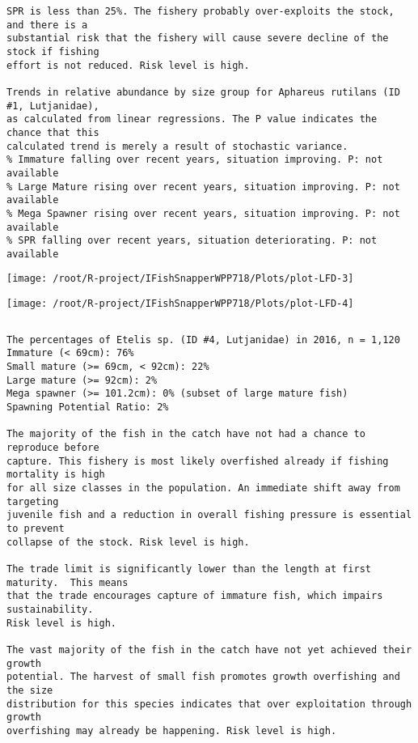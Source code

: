 \documentclass{report}\usepackage[]{graphicx}\usepackage[]{color}
\makeatletter
\def\maxwidth{ %
  \ifdim\Gin@nat@width>\linewidth
    \linewidth
  \else
    \Gin@nat@width
  \fi
}
\newenvironment{kframe}{%
 \def\at@end@of@kframe{}%
 \ifinner\ifhmode%
  \def\at@end@of@kframe{\end{minipage}}%
  \begin{minipage}{\columnwidth}%
 \fi\fi%
 \def\FrameCommand##1{\hskip\@totalleftmargin \hskip-\fboxsep
 \colorbox{shadecolor}{##1}\hskip-\fboxsep
     \hskip-\linewidth \hskip-\@totalleftmargin \hskip\columnwidth}%
 \MakeFramed {\advance\hsize-\width
   \@totalleftmargin\z@ \linewidth\hsize
   \@setminipage}}%
 {\par\unskip\endMakeFramed%
 \at@end@of@kframe}
\newenvironment{knitrout}{}{} %
\makeatother
\begin{document}
\begin{knitrout}
\begin{kframe}
\begin{verbatim}
SPR is less than 25%. The fishery probably over-exploits the stock, and there is a
substantial risk that the fishery will cause severe decline of the stock if fishing
effort is not reduced. Risk level is high.
 
Trends in relative abundance by size group for Aphareus rutilans (ID #1, Lutjanidae),
as calculated from linear regressions. The P value indicates the chance that this
calculated trend is merely a result of stochastic variance.
% Immature falling over recent years, situation improving. P: not available
% Large Mature rising over recent years, situation improving. P: not available
% Mega Spawner rising over recent years, situation improving. P: not available
% SPR falling over recent years, situation deteriorating. P: not available
\end{verbatim}
\end{kframe}
\texttt{[image: /root/R-project/IFishSnapperWPP718/Plots/plot-LFD-3]} 

\texttt{[image: /root/R-project/IFishSnapperWPP718/Plots/plot-LFD-4]} 
\begin{kframe}\begin{verbatim}
\end{verbatim}
\end{kframe}
\clearpage
\newpage
\begin{kframe}\begin{verbatim}The percentages of Etelis sp. (ID #4, Lutjanidae) in 2016, n = 1,120
Immature (< 69cm): 76%
Small mature (>= 69cm, < 92cm): 22%
Large mature (>= 92cm): 2%
Mega spawner (>= 101.2cm): 0% (subset of large mature fish)
Spawning Potential Ratio: 2%
 
The majority of the fish in the catch have not had a chance to reproduce before
capture. This fishery is most likely overfished already if fishing mortality is high
for all size classes in the population. An immediate shift away from targeting
juvenile fish and a reduction in overall fishing pressure is essential to prevent
collapse of the stock. Risk level is high.

The trade limit is significantly lower than the length at first maturity.  This means
that the trade encourages capture of immature fish, which impairs sustainability.
Risk level is high.

The vast majority of the fish in the catch have not yet achieved their growth
potential. The harvest of small fish promotes growth overfishing and the size
distribution for this species indicates that over exploitation through growth
overfishing may already be happening. Risk level is high.


\end{verbatim}
\end{kframe}
\end{knitrout}
\end{document}

